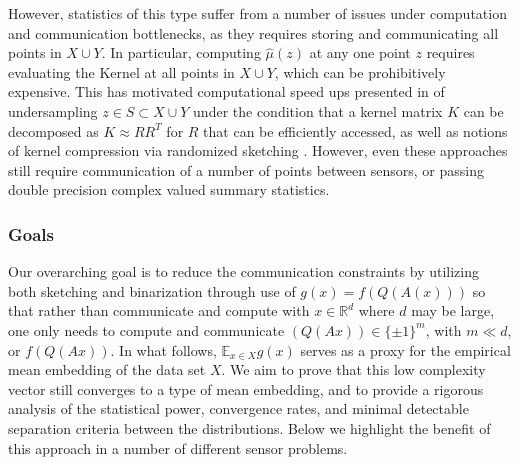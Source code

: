 \documentclass{article}
\newcommand{\R}{\mathbb{R}}
\begin{document}
However, statistics of this type suffer from a number of issues under computation and communication bottlenecks, as they requires storing and communicating all points in $X\cup Y$.
{\color{blue} In particular, computing $\hat{\mu}(z)$ at any one point $z$ requires evaluating the Kernel at all points in $X\cup Y$, which can be prohibitively expensive.}
This has motivated computational speed ups presented in \cite{cheng2017two} of undersampling $z\in S\subset X\cup Y$ under the condition that a kernel matrix $K$ can be decomposed as $K\approx RR^T$ for $R$ that can be efficiently accessed, as well as notions of kernel compression via randomized sketching \cite{gribonval2017compressive}.  However, even these approaches still require communication of a number of points between sensors, or passing double precision complex valued summary statistics.  

\subsubsection*{Goals}
Our overarching goal is to reduce the communication constraints by utilizing both sketching and binarization through use of $g(x) = f(Q(A(x)))$  {\color{blue} so that rather than communicate and compute with $x\in \R^d$ where $d$ may be large, one only needs to compute and communicate $(Q(Ax))\in \{\pm 1\}^m$, with $m\ll d$, or $f(Q(Ax))$}. In what follows, $\mathbb{E}_{x\in X} g(x)$ serves as a proxy for the empirical mean embedding of the data set $X$.  We aim to prove that this low complexity vector still converges to a type of mean embedding, and to provide a rigorous analysis of the statistical power, convergence rates, and minimal detectable separation criteria between the distributions.  Below we highlight the benefit of this approach in a number of different sensor problems.
\end{document}
